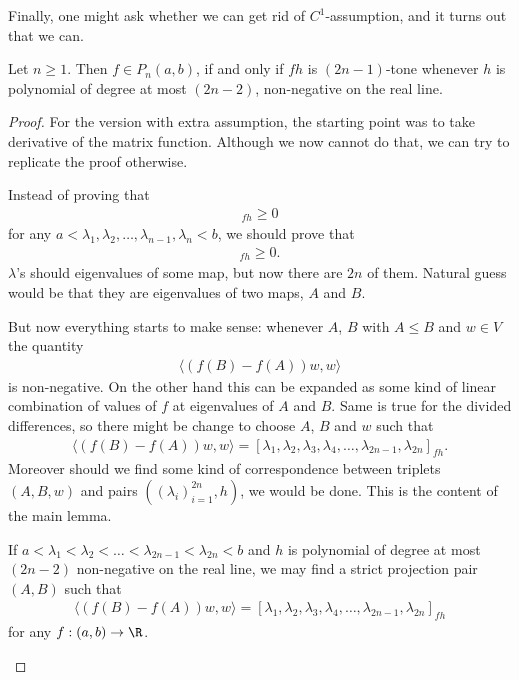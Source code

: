 Finally, one might ask whether we can get rid of $C^{1}$-assumption, and it turns out that we can.

\begin{lause}\label{main_theorem}
	Let $n \geq 1$. Then $f \in P_{n}(a, b)$, if and only if $f h$ is $(2 n - 1)$-tone whenever $h$ is polynomial of degree at most $(2 n - 2)$, non-negative on the real line. 
\end{lause}
\begin{proof}
	For the version with extra assumption, the starting point was to take derivative of the matrix function. Although we now cannot do that, we can try to replicate the proof otherwise.

	Instead of proving that
	\begin{align*}
		[\lambda_{1}, \lambda_{1}, \lambda_{2}, \lambda_{2}, \ldots, \lambda_{n}, \lambda_{n}]_{f h} \geq 0
	\end{align*}
	for any $a < \lambda_{1}, \lambda_{2}, \ldots, \lambda_{n - 1}, \lambda_{n} < b$, we should prove that
	\begin{align*}
		[\lambda_{1}, \lambda_{2}, \lambda_{3}, \lambda_{4}, \ldots, \lambda_{2n - 1}, \lambda_{2 n}]_{f h} \geq 0.
	\end{align*}
	$\lambda$'s should eigenvalues of some map, but now there are $2 n$ of them. Natural guess would be that they are eigenvalues of two maps, $A$ and $B$.

	But now everything starts to make sense: whenever $A$, $B$ with $A \leq B$ and $w \in V$ the quantity
	\begin{align*}
		\langle (f(B) - f(A)) w, w \rangle
	\end{align*}
	is non-negative. On the other hand this can be expanded as some kind of linear combination of values of $f$ at eigenvalues of $A$ and $B$. Same is true for the divided differences, so there might be change to choose $A$, $B$ and $w$ such that
	\begin{align*}
		\langle (f(B) - f(A)) w, w \rangle = [\lambda_{1}, \lambda_{2}, \lambda_{3}, \lambda_{4}, \ldots, \lambda_{2n - 1}, \lambda_{2 n}]_{f h}.
	\end{align*}
	Moreover should we find some kind of correspondence between triplets $(A, B, w)$ and pairs $((\lambda_{i})_{i = 1}^{2 n}, h)$, we would be done. This is the content of the main lemma.

	\begin{lem}\label{main_lemma}
		If $a < \lambda_{1} < \lambda_{2} < \ldots < \lambda_{2 n - 1} < \lambda_{2 n} < b$ and $h$ is polynomial of degree at most $(2 n - 2)$ non-negative on the real line, we may find a strict projection pair $(A, B)$ such that
		\begin{align*}
			\langle (f(B) - f(A)) w, w \rangle = [\lambda_{1}, \lambda_{2}, \lambda_{3}, \lambda_{4}, \ldots, \lambda_{2n - 1}, \lambda_{2 n}]_{f h}
		\end{align*}
		for any $f : (a, b) \to \R$.


\end{lem}
\end{proof}
